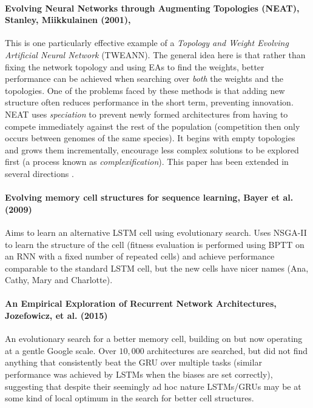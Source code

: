 \documentclass[10pt]{article}
\begin{document}
\paragraph{Evolving Neural Networks through Augmenting Topologies (NEAT), Stanley, Miikkulainen (2001), \cite{stanley2002evolving}} This is one particularly effective example of a \textit{Topology and Weight Evolving Artificial Neural Network} (TWEANN). The general idea here is that rather than fixing the network topology and using EAs to find the weights, better performance can be achieved when searching over \textit{both} the weights and the topologies.  One of the problems faced by these methods is that adding new structure often reduces performance in the short term, preventing innovation.  NEAT uses \textit{speciation} to prevent newly formed architectures from having to compete immediately against the rest of the population (competition then only occurs between genomes of the same species).   It begins with empty topologies and grows them incrementally, encourage less complex solutions to be explored first (a process known as \textit{complexification}).  This paper has been extended in several directions \cite{stanley2009hypercube,stanley2007compositional,pugh2013evolving}.

\paragraph{Evolving memory cell structures for sequence learning, Bayer et al. (2009) \cite{bayer2009evolving}} Aims to learn an alternative LSTM cell using evolutionary search.  Uses NSGA-II \cite{deb2002fast} to learn the structure of the cell (fitness evaluation is performed using BPTT on an RNN with a fixed number of repeated cells) and achieve performance comparable to the standard LSTM cell, but the new cells have nicer names (Ana, Cathy, Mary and Charlotte).

\paragraph{An Empirical Exploration of Recurrent Network Architectures, Jozefowicz, et al. (2015)~\cite{jozefowicz2015empirical}} An evolutionary search for a better memory cell, building on \cite{bayer2009evolving} but now operating at a gentle Google scale.  Over $10,000$ architectures are searched, but did not find anything that consistently beat the GRU \cite{cho2014learning} over multiple tasks (similar performance was achieved by LSTMs when the biases are set correctly), suggesting that despite their seemingly ad hoc nature LSTMs/GRUs may be at some kind of local optimum in the search for better cell structures.
\end{document}
